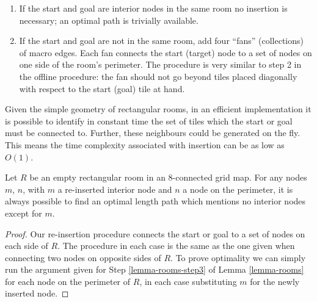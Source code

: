 \begin{enumerate}
\item{If the start and goal are interior nodes in the same room no insertion is necessary; an optimal
path is trivially available. }
\item{If the start and goal are not in the same room, add four ``fans'' (collections) of macro edges.
Each fan connects the start (target) node to a set of nodes on one side of the room's perimeter.
The procedure is very similar to step 2 in the offline procedure: the fan should not go beyond tiles
placed diagonally with respect to the start (goal) tile at hand.}
\end{enumerate}
Given the simple geometry of rectangular rooms,
in an efficient implementation it is possible to identify in constant time the set of tiles which 
the start or goal must be connected to.
Further, these neighbours could be generated on the fly.
This means the time complexity associated with insertion can be as low as $O(1)$.
\begin{lemma}
\label{lemma-insertion}
Let $R$ be an empty rectangular room in an 8-connected grid map.
For any nodes $m$, $n$, with $m$ a re-inserted interior node and $n$ a node on the perimeter, it is always possible to
find an optimal length path which mentions no interior nodes except for $m$.
\end{lemma}
\begin{proof}
Our re-insertion procedure connects the start or goal to a set of nodes on each side of $R$.
The procedure in each case is the same as the one given when connecting two nodes on opposite sides of $R$.
To prove optimality we can simply run the argument given for Step \ref{lemma-rooms-step3} of Lemma \ref{lemma-rooms} for each
node on the perimeter of $R$, in each case substituting $m$ for the newly inserted node.
\end{proof}


